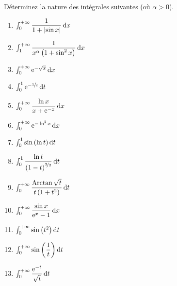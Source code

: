 \begin{exoss}
Déterminez la nature des intégrales suivantes (où \(\alpha>0\)).

\begin{enumerate}
    \item \(\int_0^{\pinf}\dfrac{1}{1+\abs{\sin x}}\odif{x}\) \\
    \item \(\int_1^{\pinf}\dfrac{1}{x^\alpha\paren{1+\sin^2x}}\odif{x}\) \\
    \item \(\int_0^{\pinf}\e{-\sqrt{x}}\odif{x}\) \\
    \item \(\int_0^1\e{-\nicefrac{1}{t}}\odif{t}\) \\
    \item \(\int_0^{\pinf}\dfrac{\ln x}{x+\e{-x}}\odif{x}\) \\
    \item \(\int_0^{\pinf}\e{-\ln^2x}\odif{x}\) \\
    \item \(\int_0^1\sin\paren{\ln t}\odif{t}\) \\
    \item \(\int_0^1\dfrac{\ln t}{\paren{1-t}^{\nicefrac{3}{2}}}\odif{t}\) \\
    \item \(\int_0^{\pinf}\dfrac{\Arctan\sqrt{t}}{t\paren{1+t^2}}\odif{t}\) \\
    \item \(\int_0^{\pinf}\dfrac{\sin x}{\e{x}-1}\odif{x}\) \\
    \item \(\int_0^{\pinf}\sin\paren{t^2}\odif{t}\) \\
    \item \(\int_0^{\pinf}\sin\paren{\dfrac{1}{t}}\odif{t}\) \\
    \item \(\int_0^{\pinf}\dfrac{\e{-t}}{\sqrt{t}}\odif{t}\)
\end{enumerate}
\end{exoss}

